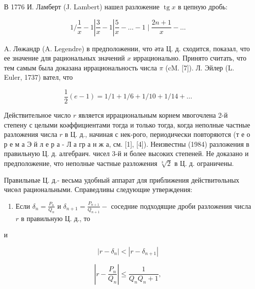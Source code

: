 \documentclass[10pt]{article}
\begin{document}
В 1776 И. Ламберт (J. Lambert) нашел разложение $\operatorname{tg} x$ в цепную дробь:



\[

1 / \frac{1}{x}-1\left|\frac{3}{x}-1\right| \frac{5}{x}-\ldots-1 \mid \frac{2 n+1}{x}-\ldots

\]



A. Лөжандр (A. Legendre) в предположении, что әта Ц. д. сходится, показал, что ее значение для рациональных значений $x$ иррационально. Принято считать, что тем самым была доказана иррациональность числа $\pi$ (cM. [7]). Л. Эйлер (L. Euler, 1737) вател, что



\[

\frac{1}{2}(e-1)=1 / 1+1 / 6+1 / 10+1 / 14+\ldots

\]



Действительное число $r$ является иррациональным корнем мвогочлена 2-й степену с целыми коәффициентами тогда и только тогда, когда неполные частные разложения числа $r$ в Ц. д., начиная с нек-рого, периодически повторяются (т е о р е м а Э й л е р а - Л а гр а н ж а, см. [1], [4]). Неизвестны (1984) разложения в правильную Ц. д. алгебраич. чисел 3-й и более высоких степеней. Не доказано и предположение, что неполные частные разложения $\sqrt[3]{2}$ в Ц. д. ограничены.



Правильные Ц. д.- весьма удобный аппарат для приближения действитөльных чисөл рациональными. Справедливы следующие утверждения:



\begin{enumerate}

  \item Если $\delta_{n}=\frac{P_{n}}{Q_{n}}$ и $\delta_{n+1}=\frac{P_{n+1}}{Q_{n+1}}-$ соседние подходящие дроби разложения числа $r$ в правильную Ц. д., то

\end{enumerate}



и



\[

\left|r-\delta_{n}\right|<\left|r-\delta_{n+1}\right|

\]



\[

\left|r-\frac{P_{n}}{Q_{n}}\right| \leqslant \frac{1}{Q_{n} Q_{n}+1},

\]
\end{document}
